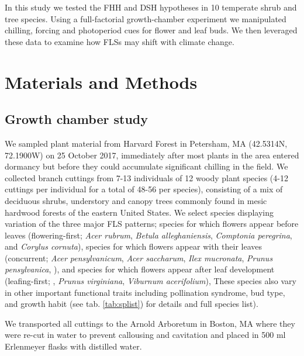 \documentclass[11pt]{article}\usepackage[]{graphicx}\usepackage[]{color}
\begin{document}
\noindent In this study we tested the FHH and DSH hypotheses in 10 temperate shrub and tree species. Using a full-factorial growth-chamber experiment we manipulated chilling, forcing and photoperiod cues for flower and leaf buds. We then leveraged these data to examine how FLSs may shift with climate change.\\ %

\section*{Materials and Methods}

\subsection*{Growth chamber study}

\noindent We sampled plant material from Harvard Forest in Petersham, MA (42.5314\degree N, 72.1900\degree W) on 25 October 2017, immediately after most plants in the area entered dormancy but before they could accumulate significant chilling in the field. We collected branch cuttings from 7-13 individuals of 12 woody plant species (4-12 cuttings per individual for a total of 48-56 per species), consisting of a mix of deciduous shrubs, understory and canopy trees commonly found in mesic hardwood forests of the eastern United States. We select species displaying variation of the three major FLS patterns; species for which flowers appear before leaves (flowering-first; \textit{Acer rubrum}, \textit{Betula alleghaniensis}, \textit{Comptonia peregrina}, and \textit{Corylus cornuta}), species for which flowers appear with their leaves (concurrent; \textit{Acer pensylvanicum}, \textit{Acer saccharum}, \textit{Ilex mucronata}, \textit{Prunus pensylvanica}, ), and species for which flowers appear after leaf development (leafing-first; , \textit{Prunus virginiana}, \textit{Viburnum acerifolium}), These species also vary in other important functional traits including pollination syndrome, bud type, and growth habit (see tab. \ref{tab:splist}) for details and full species list). 

We transported all cuttings to the Arnold Arboretum in Boston, MA where they were re-cut in water to prevent callousing and cavitation and placed in 500 ml Erlenmeyer flasks with distilled water.\\ 
\end{document}
